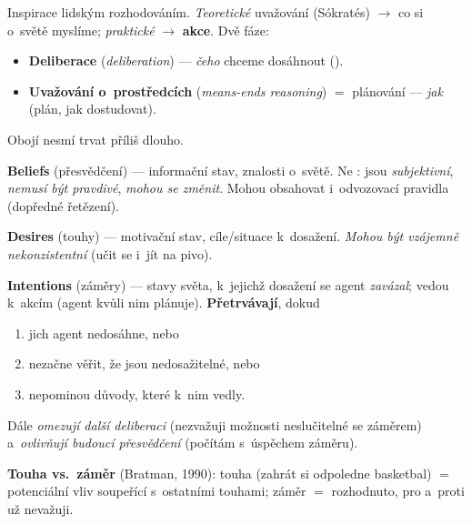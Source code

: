 \documentclass[11pt,a4paper]{article}
\theoremstyle{definition}
\begin{document}
\begin{defbox}
Inspirace lidským rozhodováním. \emph{Teoretické} uvažování (Sókratés) $\to$ co si o~světě
myslíme; \emph{praktické} $\to$ \textbf{akce}. Dvě fáze:
\begin{itemize}
\item \textbf{Deliberace} (\emph{deliberation}) --- \emph{čeho} chceme dosáhnout
  ().
\item \textbf{Uvažování o~prostředcích} (\emph{means-ends reasoning}) $=$ plánování ---
  \emph{jak} (plán, jak dostudovat).
\end{itemize}
Obojí nesmí trvat příliš dlouho.
\end{defbox}

\begin{defbox}
\textbf{Beliefs} (přesvědčení) --- informační stav, znalosti o~světě. Ne :
jsou \emph{subjektivní}, \emph{nemusí být pravdivé}, \emph{mohou se změnit}. Mohou obsahovat
i~odvozovací pravidla (dopředné řetězení).

\textbf{Desires} (touhy) --- motivační stav, cíle/situace k~dosažení. \emph{Mohou být vzájemně
nekonzistentní} (učit se i~jít na pivo).

\textbf{Intentions} (záměry) --- stavy světa, k~jejichž dosažení se agent \emph{zavázal}; vedou
k~akcím (agent kvůli nim plánuje). \textbf{Přetrvávají}, dokud
\begin{enumerate}
\item jich agent nedosáhne, nebo
\item nezačne věřit, že jsou nedosažitelné, nebo
\item nepominou důvody, které k~nim vedly.
\end{enumerate}
Dále \emph{omezují další deliberaci} (nezvažuji možnosti neslučitelné se záměrem)
a~\emph{ovlivňují budoucí přesvědčení} (počítám s~úspěchem záměru).
\end{defbox}

\noindent\textbf{Touha vs.\ záměr} (Bratman, 1990): touha (zahrát si odpoledne basketbal) $=$
potenciální vliv soupeřící s~ostatními touhami; záměr $=$ rozhodnuto, pro a~proti už nevažuji.
\end{document}
